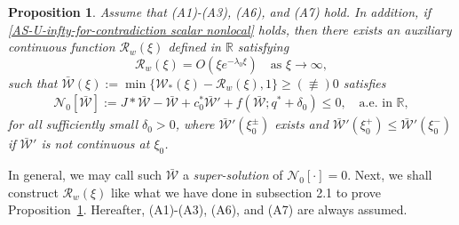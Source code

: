 \documentclass[11pt,a4paper]{article}
\newtheorem{proposition}[theorem]{\textbf{Proposition}}
\numberwithin{equation}{section}
\numberwithin{figure}{section}
\newcommand\bea{\begin{eqnarray}}
\newcommand\eea{\end{eqnarray}}
\begin{document}
\begin{proposition}\label{Prop-supersol nonlocal}
Assume that (A1)-(A3), (A6), and (A7) hold. In addition, if \eqref{AS-U-infty-for-contradiction scalar nonlocal} holds,
then there exists an auxiliary continuous function $\mathcal{R}_w(\xi)$ defined in $\mathbb{R}$ satisfying
\begin{equation}\label{decay rate of Rw nonlocal}
\mathcal{R}_w(\xi)=O(\xi e^{-\lambda_0\xi}) \quad \mbox{as $\xi\to\infty$},
\end{equation}
such that $\bar{\mathcal{W}}(\xi):=\min\{\mathcal{W}_{*}(\xi)-\mathcal{R}_w(\xi),1\}\geq (\not\equiv) 0$
satisfies
\bea\label{tw super solution scalar nonlocal}
\mathcal{N}_0[\bar{\mathcal{W}}]:=J\ast\bar{\mathcal{W}}-\bar{\mathcal{W}}+c^*_0\bar{\mathcal{W}}'+f(\bar{\mathcal{W}};q^*+\delta_0)\le0,\quad  \mbox{a.e. in $\mathbb{R}$},
\eea
for all sufficiently small $\delta_0>0$, where
${\bar{\mathcal{W}}}'(\xi_0^{\pm})$ exists and
${\bar{\mathcal{W}}}'(\xi_0^+)\leq {\bar{\mathcal{W}}}'(\xi_0^-)$
if $\bar{\mathcal{W}}'$ is not continuous at $\xi_0$.
\end{proposition}

In general, we may call such $\bar{\mathcal{W}}$ a {\em super-solution} of $\mathcal{N}_0[\cdot]=0$.
Next, we shall construct $\mathcal{R}_w(\xi)$ like what we have done in subsection 2.1 to prove Proposition~\ref{Prop-supersol nonlocal}.
Hereafter, (A1)-(A3), (A6), and (A7)  are always assumed.
\end{document}
